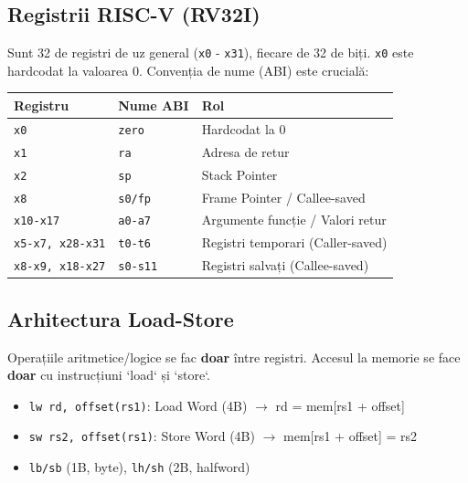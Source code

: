 \documentclass[12pt,a4paper]{article}
\begin{document}
\subsection{Registrii RISC-V (RV32I)}
Sunt 32 de registri de uz general (\texttt{x0} - \texttt{x31}), fiecare de 32 de biți. \texttt{x0} este hardcodat la valoarea 0.
Convenția de nume (ABI) este crucială:
\begin{table}[ht!]
\centering
\begin{tabular}{lll}
\toprule
\textbf{Registru} & \textbf{Nume ABI} & \textbf{Rol} \\
\midrule
\texttt{x0} & \texttt{zero} & Hardcodat la 0 \\
\texttt{x1} & \texttt{ra} & Adresa de retur \\
\texttt{x2} & \texttt{sp} & Stack Pointer \\
\texttt{x8} & \texttt{s0/fp} & Frame Pointer / Callee-saved \\
\texttt{x10-x17} & \texttt{a0-a7} & Argumente funcție / Valori retur \\
\texttt{x5-x7, x28-x31} & \texttt{t0-t6} & Registri temporari (Caller-saved) \\
\texttt{x8-x9, x18-x27} & \texttt{s0-s11} & Registri salvați (Callee-saved) \\
\bottomrule
\end{tabular}
\end{table}

\subsection{Arhitectura Load-Store}
Operațiile aritmetice/logice se fac \textbf{doar} între registri. Accesul la memorie se face \textbf{doar} cu instrucțiuni `load` și `store`.

\begin{itemize}
    \item \texttt{lw rd, offset(rs1)}: Load Word (4B) $\rightarrow$ rd = mem[rs1 + offset]
    \item \texttt{sw rs2, offset(rs1)}: Store Word (4B) $\rightarrow$ mem[rs1 + offset] = rs2
    \item \texttt{lb/sb} (1B, byte), \texttt{lh/sh} (2B, halfword)
\end{itemize}
\end{document}
